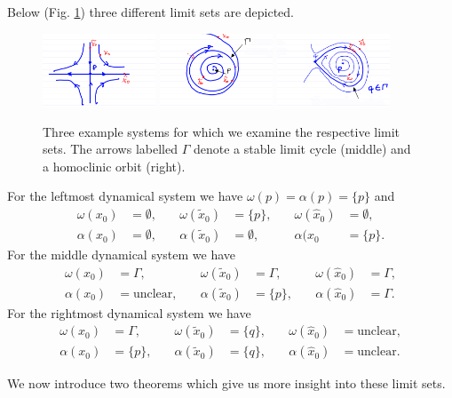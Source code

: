 \begin{ex}
	Below (Fig. \ref{fig:limset_ex}) three different limit sets are depicted.
	\begin{figure}[h!]
		\centering
		\includegraphics[width=0.3\textwidth]{figures/ch4/6limset_ex_1.png}
		\includegraphics[width=0.3\textwidth]{figures/ch4/6limset_ex_2.png}
		\includegraphics[width=0.3\textwidth]{figures/ch4/6limset_ex_3.png}
		\caption{Three example systems for which we examine the respective limit sets. The arrows labelled $\Gamma $ denote a stable limit cycle (middle) and a homoclinic orbit (right).}
		\label{fig:limset_ex}
	\end{figure}
	For the leftmost dynamical system we have $\omega(p)=\alpha(p)=\{p\}$ and
\begin{align}
	\omega(x_0) &= \emptyset, \quad &\omega(\tilde{x}_0) &= \{p\}, \quad &{\omega }(\hat{x}_0)&= \emptyset, \\
	\alpha(x_0)&=\emptyset, \quad & \alpha(\tilde{x}_0)&=\emptyset,\quad &\alpha(\hat{x}_0&=\{p\}.
\end{align}
	For the middle dynamical system we have 
\begin{align}
	\omega(x_0) &= \Gamma, \quad &\omega(\tilde{x}_0) &= \Gamma, \quad &{\omega }(\hat{x}_0)&= \Gamma, \\
	\alpha(x_0)&= \textrm{unclear} , \quad & \alpha(\tilde{x}_0)&=\{p\},\quad &\alpha(\hat{x}_0)&=\Gamma.
\end{align}
	For the rightmost dynamical system we have 
\begin{align}
	\omega(x_0) &= \Gamma, \quad &\omega(\tilde{x}_0) &= \{q\}, \quad &{\omega }(\hat{x}_0)&=  \textrm{unclear}, \\
	\alpha(x_0)&= \{p\} , \quad & \alpha(\tilde{x}_0)&=\{q\},\quad &\alpha(\hat{x}_0)&= \textrm{unclear} .
\end{align}
\end{ex}

We now introduce two theorems which give us more insight into these limit sets.
